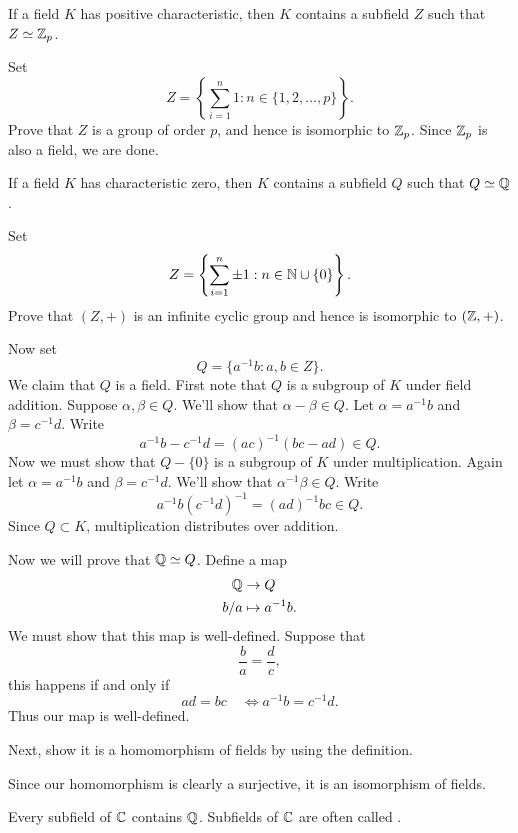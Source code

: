 \documentclass{ximera}
\begin{document}
\begin{theorem}
  If a field $K$ has positive characteristic, then $K$ contains a
  subfield $Z$ such that $Z\simeq \mathbb Z_p$.
  \begin{sketch}
    Set
    \[
    Z =\left\{\sum_{i=1}^n 1:n\in\{1,2,\dots,p\}\right\}.
    \]
    Prove that $Z$ is a group of order $p$, and hence is isomorphic to
    $\mathbb Z_p$. Since $\mathbb Z_p$ is also a field, we are done.
  \end{sketch}
\end{theorem}





\begin{theorem}
  If a field $K$ has characteristic zero, then $K$ contains a
  subfield $Q$ such that $Q\simeq \mathbb Q$.
  \begin{sketch}
    Set
    \[
    Z =\left\{\sum_{i=1}^n \pm 1:n\in \mathbb N\cup\{0\}\right\}.
    \]
    Prove that $(Z,+)$ is an infinite cyclic group and hence is
    isomorphic to $(\mathbb Z,+)$.

    Now set
    \[
    Q = \{a^{-1}b : a,b\in Z\}.
    \]
    We claim that $Q$ is a field. First note that $Q$ is a subgroup of
    $K$ under field addition. Suppose $\alpha,\beta\in Q$. We'll
    show that $\alpha-\beta\in Q$. Let $\alpha = a^{-1}b$ and $\beta=
    c^{-1}d$. Write
    \[
    a^{-1}b - c^{-1} d = (ac)^{-1}(bc- ad)\in Q.
    \]
    Now we must show that $Q-\{0\}$ is a subgroup of $K$ under
    multiplication. Again let $\alpha = a^{-1}b$ and $\beta=
    c^{-1}d$. We'll show that $\alpha^{-1}\beta \in Q$. Write
    \[
    a^{-1}b (c^{-1}d)^{-1} = (ad)^{-1} bc\in Q.
    \]
    Since $Q\subset K$, multiplication distributes over addition.

    Now we will prove that $\mathbb Q\simeq Q$. Define a map
    \begin{align*}
      \mathbb Q &\to Q\\
      b/a &\mapsto a^{-1} b.
    \end{align*}
    We must show that this map is well-defined.
    Suppose that
    \[
    \frac{b}{a} = \frac{d}{c},
    \]
    this happens if and only if
    \[
    ad = bc\quad\Leftrightarrow a^{-1} b = c^{-1} d.
    \]
    Thus our map is well-defined.

    Next, show it is a homomorphism of fields by using the definition.


    Since our homomorphism is clearly a surjective, it is an
    isomorphism of fields.
  \end{sketch}
\end{theorem}

\begin{corollary}
  Every subfield of $\mathbb C$ contains $\mathbb Q$. Subfields of $\mathbb C$ are often
  called .
\end{corollary}
\end{document}
